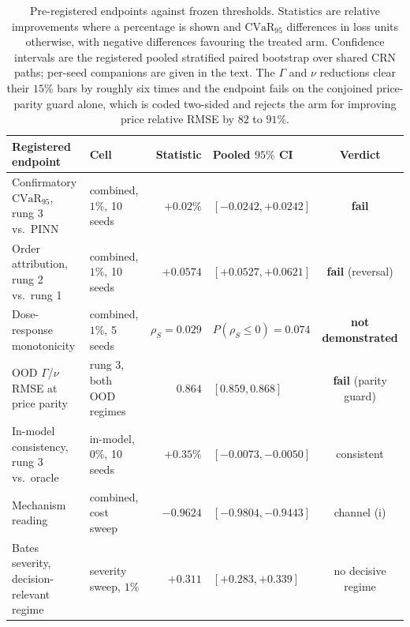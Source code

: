 \documentclass[10pt]{article}
\begin{document}
\begin{table}[!htbp]
\centering\footnotesize\setlength{\tabcolsep}{3.5pt}
\begin{tabular}{@{}llrlc@{}}
\toprule
Registered endpoint & Cell & Statistic & Pooled $95\%$ CI & Verdict \\
\midrule
Confirmatory $\mathrm{CVaR}_{95}$, rung 3 vs.\ PINN & combined, $1\%$, 10 seeds & $+0.02\%$ & $[-0.0242,+0.0242]$ & \textbf{fail} \\
Order attribution, rung 2 vs.\ rung 1 & combined, $1\%$, 10 seeds & $+0.0574$ & $[+0.0527,+0.0621]$ & \textbf{fail} (reversal) \\
Dose-response monotonicity & combined, $1\%$, 5 seeds & $\rho_S=0.029$ & $P(\rho_S\le0)=0.074$ & \textbf{not demonstrated} \\
OOD $\Gamma$/$\nu$ RMSE at price parity & rung 3, both OOD regimes & $0.864$ & $[0.859,0.868]$ & \textbf{fail} (parity guard) \\
In-model consistency, rung 3 vs.\ oracle & in-model, $0\%$, 10 seeds & $+0.35\%$ & $[-0.0073,-0.0050]$ & consistent \\
Mechanism reading & combined, cost sweep & $-0.9624$ & $[-0.9804,-0.9443]$ & channel (i) \\
Bates severity, decision-relevant regime & severity sweep, $1\%$ & $+0.311$ & $[+0.283,+0.339]$ & no decisive regime \\
\bottomrule
\end{tabular}
\caption{Pre-registered endpoints against frozen thresholds. Statistics are
relative improvements where a percentage is shown and $\mathrm{CVaR}_{95}$
differences in loss units otherwise, with negative differences favouring the
treated arm. Confidence intervals are the registered pooled stratified paired
bootstrap over shared CRN paths; per-seed companions are given in the text. The
$\Gamma$ and $\nu$ reductions clear their $15\%$ bars by roughly six times and the
endpoint fails on the conjoined price-parity guard alone, which is coded two-sided
and rejects the arm for improving price relative RMSE by $82$ to $91\%$.}
\label{tab:verdicts}
\end{table}
\end{document}

